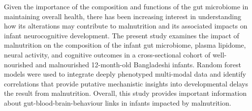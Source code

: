 \documentclass{article}
\begin{document}
Given the importance of the composition and functions of the gut microbiome in maintaining overall health, there has been increasing interest in understanding how its alterations may contribute to malnutrition and its associated impacts on infant neurocognitive development.
The present study examines the impact of malnutrition on the composition of the infant gut microbiome, plasma lipidome, neural activity, and cognitive outcomes in a cross-sectional cohort of well-nourished and malnourished 12-month-old Bangladeshi infants.
Random forest models were used to integrate deeply phenotyped multi-modal data and identify correlations that provide putative mechanistic insights into developmental delays the result from malnutrition.
Overall, this study provides important information about gut-blood-brain-behaviour links in infants impacted by malnutrition.
\end{document}
